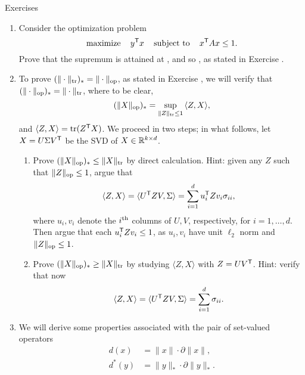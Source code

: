 \begin{xcb}{Exercises}
\begin{enumerate}[label=\thechapter.\arabic*]
\item \label{ex:scaled_euclidean_norm_dual}
  Consider the optimization problem
  \[
  \operatorname*{maximize} \quad y^{\mathsf{T}} x \quad \operatorname{subject\,\,to} \quad x^{\mathsf{T}} A x \leq 1. 
  \]
  Prove that the supremum is attained at , and so , as stated
  in Exercise . 

\item \label{ex:trace_norm_dual}
  To prove $(\|\cdot\|_{\operatorname{tr}})_* = \|\cdot\|_{\mathrm{op}}$, as stated in Exercise
  , we will verify that $(\|\cdot\|_{\mathrm{op}})_* = 
  \|\cdot\|_{\operatorname{tr}}$, where to be clear,
  \[
  (\|X\|_{\mathrm{op}})_* = \sup_{\|Z\|_{\operatorname{tr}} \leq 1} \, \langle Z, X \rangle, 
  \]
  and $\langle Z, X \rangle = \operatorname{tr}(Z^{\mathsf{T}} X)$. We proceed in two steps; in what
  follows, let $X = U \Sigma V^{\mathsf{T}}$ be the SVD of $X \in \mathbb{R}^{k \times d}$.

\begin{enumerate}[label=\alph*.] 
\item Prove $(\|X\|_{\mathrm{op}})_* \leq \|X\|_{\operatorname{tr}}$ by direct calculation. Hint:
  given any $Z$ such that $\|Z\|_{\mathrm{op}} \leq 1$, argue that 
  \[
  \langle Z, X \rangle = \langle U^{\mathsf{T}} Z V, \Sigma \rangle = \sum_{i=1}^d u_i^{\mathsf{T}}
  Z v_i \sigma_{ii}, 
  \]
  where $u_i,v_i$ denote the $i^{\textnormal{th}}$ columns of $U,V$, respectively, for $i =
  1,\dots,d$. Then argue that each $u_i^{\mathsf{T}} Z v_i \leq 1$, as $u_i,v_i$ have 
  unit $\ell_2$ norm and $\|Z\|_{\mathrm{op}} \leq 1$.

\item Prove $(\|X\|_{\mathrm{op}})_* \geq \|X\|_{\operatorname{tr}}$ by studying $\langle Z, X
  \rangle$ with $Z = U V^{\mathsf{T}}$. Hint: verify that now  
  \[
  \langle Z, X \rangle = \langle U^{\mathsf{T}} Z V, \Sigma \rangle = \sum_{i=1}^d
  \sigma_{ii}.
  \]
\end{enumerate}


\item \label{ex:norm_squared_conjugate}
  We will derive some properties associated with the pair of set-valued
  operators   
  \begin{align*}
  d(x) &= \|x\| \cdot \partial \|x\|, \\
  d^*(y) &= \|y\|_* \cdot \partial \|y\|_*.
  \end{align*}


\end{enumerate}
\end{xcb}
